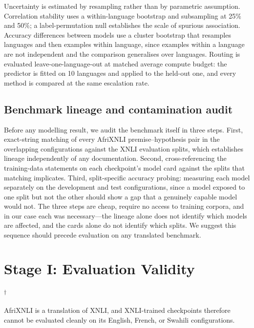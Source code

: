 \documentclass[11pt]{article}
\newcommand{\claim}[1]{#1}   %
\newcommand{\nodelta}{\textsuperscript{$\dagger$}}
\begin{document}
Uncertainty is estimated by resampling rather than by parametric assumption.
Correlation stability uses a within-language bootstrap and subsampling at 25\% and
50\%; a label-permutation null establishes the scale of spurious association.
Accuracy differences between models use a cluster bootstrap that resamples
languages and then examples within language, since examples within a language are
not independent and the comparison generalises over languages. Routing is
evaluated leave-one-language-out at matched average compute budget: the predictor
is fitted on 10 languages and applied to the held-out one, and every method is
compared at the same escalation rate.

\subsection{Benchmark lineage and contamination audit}
\label{sec:audit}
Before any modelling result, we audit the benchmark itself in three steps.
First, exact-string matching of every AfriXNLI premise--hypothesis pair in the
overlapping configurations against the XNLI evaluation splits, which establishes
lineage independently of any documentation. Second, cross-referencing the
training-data statements on each checkpoint's model card against the splits that
matching implicates. Third, split-specific accuracy probing: measuring each model
separately on the development and test configurations, since a model exposed to
one split but not the other should show a gap that a genuinely capable model would
not. The three steps are cheap, require no access to training corpora, and in our
case each was necessary---the lineage alone does not identify which models are
affected, and the cards alone do not identify which splits. We suggest this
sequence should precede evaluation on any translated benchmark.

\section{Stage I: Evaluation Validity}\nodelta
\label{sec:f1}
{\renewcommand{\thefootnote}{}\addtocounter{footnote}{-1}}

\claim{AfriXNLI is a translation of XNLI, and XNLI-trained checkpoints therefore
cannot be evaluated cleanly on its English, French, or Swahili configurations.}
\end{document}

